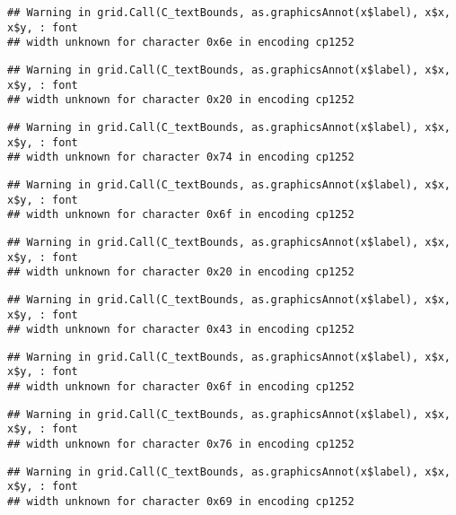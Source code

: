 \documentclass[
]{article}
\begin{document}
\begin{verbatim}
## Warning in grid.Call(C_textBounds, as.graphicsAnnot(x$label), x$x, x$y, : font
## width unknown for character 0x6e in encoding cp1252
\end{verbatim}

\begin{verbatim}
## Warning in grid.Call(C_textBounds, as.graphicsAnnot(x$label), x$x, x$y, : font
## width unknown for character 0x20 in encoding cp1252
\end{verbatim}

\begin{verbatim}
## Warning in grid.Call(C_textBounds, as.graphicsAnnot(x$label), x$x, x$y, : font
## width unknown for character 0x74 in encoding cp1252
\end{verbatim}

\begin{verbatim}
## Warning in grid.Call(C_textBounds, as.graphicsAnnot(x$label), x$x, x$y, : font
## width unknown for character 0x6f in encoding cp1252
\end{verbatim}

\begin{verbatim}
## Warning in grid.Call(C_textBounds, as.graphicsAnnot(x$label), x$x, x$y, : font
## width unknown for character 0x20 in encoding cp1252
\end{verbatim}

\begin{verbatim}
## Warning in grid.Call(C_textBounds, as.graphicsAnnot(x$label), x$x, x$y, : font
## width unknown for character 0x43 in encoding cp1252
\end{verbatim}

\begin{verbatim}
## Warning in grid.Call(C_textBounds, as.graphicsAnnot(x$label), x$x, x$y, : font
## width unknown for character 0x6f in encoding cp1252
\end{verbatim}

\begin{verbatim}
## Warning in grid.Call(C_textBounds, as.graphicsAnnot(x$label), x$x, x$y, : font
## width unknown for character 0x76 in encoding cp1252
\end{verbatim}

\begin{verbatim}
## Warning in grid.Call(C_textBounds, as.graphicsAnnot(x$label), x$x, x$y, : font
## width unknown for character 0x69 in encoding cp1252
\end{verbatim}
\end{document}
